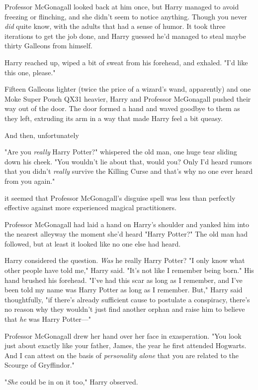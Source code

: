 Professor McGonagall looked back at him once, but Harry managed to avoid
freezing or flinching, and she didn't seem to notice anything. Though you never
\emph{did} quite know, with the adults that had a sense of humor. It took
three iterations to get the job done, and Harry guessed he'd managed to steal
maybe thirty Galleons from himself.

Harry reached up, wiped a bit of sweat from his forehead, and exhaled. "I'd
like this one, please."

Fifteen Galleons lighter (twice the price of a wizard's wand, apparently) and
one Moke Super Pouch QX31 heavier, Harry and Professor McGonagall pushed their
way out of the door. The door formed a hand and waved goodbye to them as they
left, extruding its arm in a way that made Harry feel a bit queasy.

And then, unfortunately{\el}

"Are you \emph{really} Harry Potter?" whispered the old man, one huge tear
sliding down his cheek. "You wouldn't lie about that, would you? Only I'd heard
rumors that you didn't \emph{really} survive the Killing Curse and that's why
no one ever heard from you again."

{\el} it seemed that Professor McGonagall's disguise spell was less than
perfectly effective against more experienced magical practitioners.

Professor McGonagall had laid a hand on Harry's shoulder and yanked him into
the nearest alleyway the moment she'd heard "Harry Potter?" The old man had
followed, but at least it looked like no one else had heard.

Harry considered the question. \emph{Was} he really Harry Potter? "I only know
what other people have told me," Harry said. "It's not like I remember being
born." His hand brushed his forehead. "I've had this scar as long as I
remember, and I've been told my name was Harry Potter as long as I remember.
But," Harry said thoughtfully, "if there's already sufficient cause to
postulate a conspiracy, there's no reason why they wouldn't just find another
orphan and raise him to believe that \emph{he} was Harry Potter—"

Professor McGonagall drew her hand over her face in exasperation. "You look
just about exactly like your father, James, the year he first attended
Hogwarts. And I can attest on the basis of \emph{personality alone} that you
are related to the Scourge of Gryffindor."

"\emph{She} could be in on it too," Harry observed.

